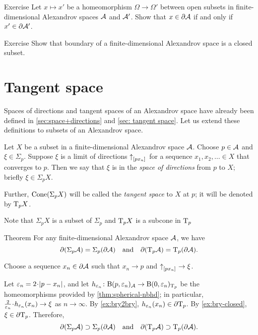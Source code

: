 \begin{thm}{Exercise}\label{ex:bry2bry}
Let $x\mapsto x'$ be a homeomorphism $\Omega\to\Omega'$
between open subsets in finite-dimensional Alexandrov spaces $\mathcal{A}$ and $\mathcal{A}'$.
Show that $x\in \partial \mathcal{A}$ if and only if $x'\in \partial \mathcal{A}'$.

\end{thm}

\begin{thm}{Exercise}\label{ex:bry-closed}
Show that boundary of a finite-dimensional Alexandrov space is a closed subset.
\end{thm}

\section{Tangent space}

Spaces of directions and tangent spaces of an Alexandrov space have already been defined in \ref{sec:space+directions} and \ref{sec: tangent space}.
Let us extend these definitions to subsets of an Alexandrov space.

Let $X$ be a subset in a finite-dimensional Alexandrov space $\mathcal{A}$.
Choose $p\in \mathcal{A}$ and $\xi\in \Sigma_p$.
Suppose $\xi$ is a limit of directions ${\uparrow}_{[{p}{x_n}]_{{}}}$ for a sequence $x_1,x_2,\dots{}\in X$ that converges to $p$.
Then we say that $\xi$ is in the \emph{space of directions} from $p$ to $X$;
briefly $\xi\in\Sigma_pX$.

Further, $\mathop{\rm Cone}\nolimits(\Sigma_pX)$ will be called the \emph{tangent space} to $X$ at $p$;
it will be denoted by $\mathrm{T}_pX$.

Note that $\Sigma_pX$ is a subset of $\Sigma_p$ and $\mathrm{T}_pX$ is a subcone in $\mathrm{T}_p$

\begin{thm}{Theorem}\label{thm:partial-Sigma}
For any finite-dimensional Alexandrov space $\mathcal{A}$, we have
\[\partial (\Sigma_p\mathcal{A})=\Sigma_p(\partial\mathcal{A})
\quad\text{and}\quad
\partial(\mathrm{T}_p\mathcal{A})=\mathrm{T}_p(\partial\mathcal{A}).\]
\end{thm}

Choose a sequence $x_n\in \partial \mathcal{A}$ such that $x_n\to p$ and ${\uparrow}_{[{p}{x_n}]_{{}}}\to\xi$.

Let $\eps_n=2\cdot \dist{p}{x_n}{}$,
and let $h_{\varepsilon_n}\colon\mathrm{B}{}(p,\varepsilon_n)_{\mathcal{A}}\to \mathrm{B}{}(0,\varepsilon_n)_{\mathrm{T}_p}$ be the homeomorphisms provided by \ref{thm:spherical-nbhd};
in particular, $\tfrac2{\eps_n}\cdot h_{\eps_n}(x_n)\to \xi$ as $n\to\infty$.
By \ref{ex:bry2bry}, $h_{\varepsilon_n}(x_n)\in \partial \mathrm{T}_p$.
By \ref{ex:bry-closed}, $\xi\in \partial \mathrm{T}_p$.
Therefore,
\[\partial (\Sigma_p\mathcal{A})\supset\Sigma_p(\partial\mathcal{A})
\quad\text{and}\quad
\partial(\mathrm{T}_p\mathcal{A})\supset\mathrm{T}_p(\partial\mathcal{A}).\]

